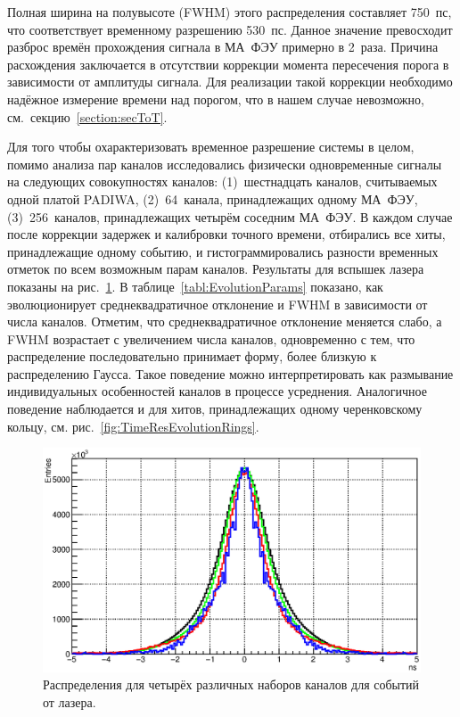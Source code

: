 Полная ширина на полувысоте (FWHM) этого распределения составляет 750~пс, что соответствует временному разрешению 530~пс. Данное значение превосходит разброс времён прохождения сигнала в МА~ФЭУ примерно в 2~раза. Причина расхождения заключается в отсутствии коррекции момента пересечения порога в зависимости от амплитуды сигнала. Для реализации такой коррекции необходимо надёжное измерение времени над порогом, что в нашем случае невозможно, см.~секцию~\ref{section:secToT}.

Для того чтобы охарактеризовать временное разрешение системы в целом, помимо анализа пар каналов исследовались физически одновременные сигналы на следующих совокупностях каналов: (1)~шестнадцать каналов, считываемых одной платой PADIWA, (2)~64~канала, принадлежащих одному МА~ФЭУ, (3)~256~каналов, принадлежащих четырём соседним МА~ФЭУ. В каждом случае после коррекции задержек и калибровки точного времени, отбирались все хиты, принадлежащие одному событию, и гистограммировались разности временных отметок по всем возможным парам каналов. Результаты для вспышек лазера показаны на рис.~\ref{fig:TimeResEvolutionLaser}. В таблице~\ref{tabl:EvolutionParams} показано, как эволюционирует среднеквадратичное отклонение и FWHM в зависимости от числа каналов.
Отметим, что среднеквадратичное отклонение меняется слабо, а FWHM возрастает с увеличением числа каналов, одновременно с тем, что распределение последовательно принимает форму, более близкую к распределению Гаусса. Такое поведение можно интерпретировать как размывание индивидуальных особенностей каналов в процессе усреднения. Аналогичное поведение наблюдается и для хитов, принадлежащих одному черенковскому кольцу, см. рис.~\ref{fig:TimeResEvolutionRings}.

\begin{figure}
\includegraphics[width=1.0\textwidth]{pictures/TimePrecision_evolution_laser.eps}
\caption{Распределения для четырёх различных наборов каналов для событий от лазера.}
\label{fig:TimeResEvolutionLaser}
\end{figure}

